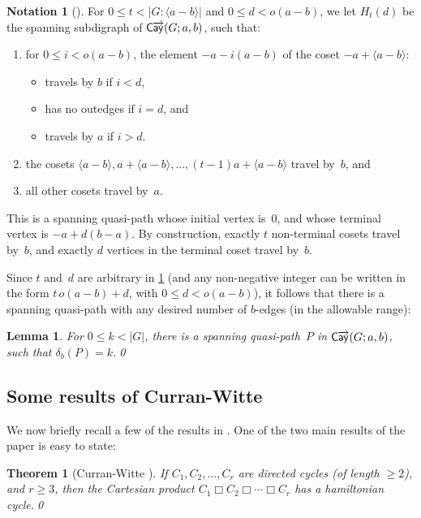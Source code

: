 \documentclass[11pt]{amsart}
\newtheorem{thm}[equation]{Theorem}
\newtheorem{lem}[equation]{Lemma}
\theoremstyle{definition}
\newtheorem{notation}[equation]{Notation}
\numberwithin{case}{startcases}
\numberwithin{equation}{section}
\newcommand{\cartprod}{\mathbin{\Box}}
\newcommand{\cayd}{\mathop{\mathsf{C}\mkern-1mu\overrightarrow{\mathsf{ay}}}}
\begin{document}
	\begin{notation}[{\cite[Defn.~5.2]{Curran}}] \label{Htd}
		For $0 \le t < |G : \langle a-b \rangle|$ and $0 \le d < o(a - b)$, we let $H_t(d)$ be the spanning subdigraph of $\cayd(G; a,b)$, such that:
		\begin{enumerate}
			\item for $0 \le i < o(a - b)$, the element $-a - i(a - b)$ of the coset $-a + \langle a - b \rangle$:
			\begin{itemize}
				\item travels by $b$ if $i < d$,
				\item has no outedges if $i = d$,
				and
				\item travels by $a$ if $i > d$.
			\end{itemize}
			\item the cosets $\langle a - b \rangle, a + \langle a - b \rangle, \ldots, (t-1)a + \langle a - b \rangle$ travel by~$b$,
			and
			\item all other cosets travel by~$a$.
		\end{enumerate}
		This is a spanning quasi-path whose initial vertex is~$0$, and whose terminal vertex is $-a + d(b - a)$.
		By construction, exactly $t$ non-terminal cosets travel by~$b$, and exactly $d$ vertices in the terminal coset travel by~$b$.
	\end{notation}
	
	Since $t$ and~$d$ are arbitrary in \cref{Htd} (and any non-negative integer can be written in the form $t \, o(a - b) + d$, with $0 \le d < o(a - b)$), it follows that there is a spanning quasi-path with any desired number of $b$-edges (in the allowable range):
	
	\begin{lem} \label{anydelta}
		For $0 \le k < |G|$, there is a spanning quasi-path~$P$ in $\cayd(G; a,b)$, such that $\delta_b(P) = k$.\qed
	\end{lem}
	
	
	
	
	\subsection{Some results of Curran-Witte}
	
	We now briefly recall a few of the results in \cite{Curran}. One of the two main results of the paper is easy to state:
	
	\begin{thm}[Curran-Witte {\cite[Thm.~9.1]{Curran}}] \label{HamCycInC1xC2xC3}
		If $C_1,C_2,\ldots,C_r$ are directed cycles \textup(of length $\ge 2$\textup), and $r \ge 3$, then the Cartesian product $C_1 \cartprod C_2 \cartprod \cdots \cartprod C_r$ has a hamiltonian cycle.\qed
	\end{thm}
	
\end{document}
